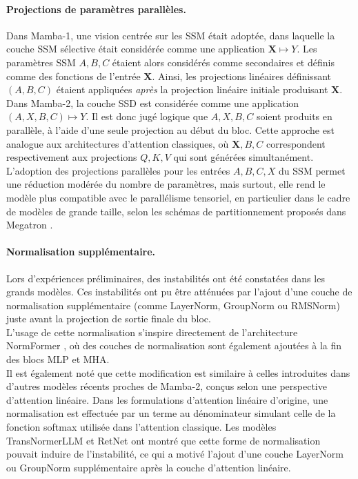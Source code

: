 \paragraph{Projections de paramètres parallèles.} Dans Mamba-1, une vision centrée sur les SSM était adoptée, dans laquelle la couche SSM sélective était considérée comme une application $\mathbf{X} \mapsto Y$. Les paramètres SSM $A, B, C$ étaient alors considérés comme secondaires et définis comme des fonctions de l’entrée $\mathbf{X}$. Ainsi, les projections linéaires définissant $(A, B, C)$ étaient appliquées \emph{après} la projection linéaire initiale produisant $\mathbf{X}$.\\

Dans Mamba-2, la couche SSD est considérée comme une application $(A, X, B, C) \mapsto Y$. Il est donc jugé logique que $A, X, B, C$ soient produits en parallèle, à l’aide d’une seule projection au début du bloc. Cette approche est analogue aux architectures d’attention classiques, où $\mathbf{X}, B, C$ correspondent respectivement aux projections $Q, K, V$ qui sont générées simultanément.\\

L’adoption des projections parallèles pour les entrées $A, B, C, X$ du SSM permet une réduction modérée du nombre de paramètres, mais surtout, elle rend le modèle plus compatible avec le parallélisme tensoriel, en particulier dans le cadre de modèles de grande taille, selon les schémas de partitionnement proposés dans Megatron \citep{shoeybi2019megatron}.

\paragraph{Normalisation supplémentaire.}Lors d’expériences préliminaires, des instabilités ont été constatées dans les grands modèles. Ces instabilités ont pu être atténuées par l’ajout d’une couche de normalisation supplémentaire (comme LayerNorm, GroupNorm ou RMSNorm) juste avant la projection de sortie finale du bloc.\\

L’usage de cette normalisation s’inspire directement de l’architecture NormFormer \citep{shleifer2021normformer}, où des couches de normalisation sont également ajoutées à la fin des blocs MLP et MHA.\\

Il est également noté que cette modification est similaire à celles introduites dans d’autres modèles récents proches de Mamba-2, conçus selon une perspective d’attention linéaire. Dans les formulations d’attention linéaire d’origine, une normalisation est effectuée par un terme au dénominateur simulant celle de la fonction softmax utilisée dans l’attention classique. Les modèles TransNormerLLM \citep{qin2023transnormerllm} et RetNet \citep{sun2023retnet} ont montré que cette forme de normalisation pouvait induire de l’instabilité, ce qui a motivé l’ajout d’une couche LayerNorm ou GroupNorm supplémentaire après la couche d’attention linéaire.\\

